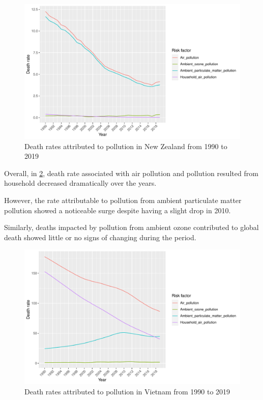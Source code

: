 \documentclass[11pt,a4paper,]{article}
\begin{document}
\begin{figure}[H]

{\centering \includegraphics{Assignment4_files/figure-latex/nzfig-1} 

}

\caption{Death rates attributed to pollution in New Zealand from 1990 to 2019}\label{fig:nzfig}
\end{figure}

Overall, in \ref{fig:vnfig}, death rate associated with air pollution and pollution resulted from household decreased dramatically over the years.

However, the rate attributable to pollution from ambient particulate matter pollution showed a noticeable surge despite having a slight drop in 2010.

Similarly, deaths impacted by pollution from ambient ozone contributed to global death showed little or no signs of changing during the period.

\begin{figure}[H]

{\centering \includegraphics{Assignment4_files/figure-latex/vnfig-1} 

}

\caption{Death rates attributed to pollution in Vietnam from 1990 to 2019}\label{fig:vnfig}
\end{figure}
\end{document}
